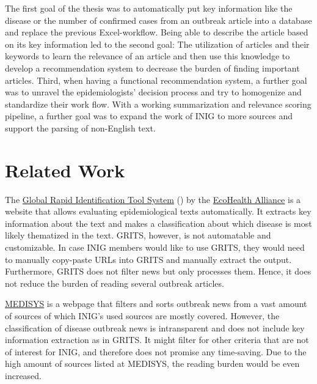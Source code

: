   The first goal of the thesis was to automatically put key information like the disease or the number of confirmed cases from an outbreak article into a database and replace the previous Excel-workflow. Being able to describe the article based on its key information led to the second goal: The utilization of articles and their keywords to learn the relevance of an article and then use this knowledge to develop a recommendation system to decrease the burden of finding important articles.
  Third, when having a functional recommendation system, a further goal was to unravel the epidemiologists' decision process and try to homogenize and standardize their work flow.
  With a working summarization and relevance scoring pipeline, a further goal was to expand the work of INIG to more sources and support the parsing of non-English text.


\section{Related Work}
  The \href{https://grits.eha.io}{Global Rapid Identification Tool System} () by the \href{https://www.ecohealthalliance.org}{EcoHealth Alliance} is a website that allows evaluating epidemiological texts automatically.
  It extracts key information about the text and makes a classification about which disease is most likely thematized in the text.
  GRITS, however, is not automatable and customizable.
  In case INIG members would like to use GRITS, they would need to manually copy-paste URLs into GRITS and manually extract the output.
  Furthermore, GRITS does not filter news but only processes them.
  Hence, it does not reduce the burden of reading several outbreak articles.

  \href{http://medisys.newsbrief.eu}{MEDISYS} is a webpage that filters and sorts outbreak news from a vast amount of sources of which INIG's used sources are mostly covered.
  However, the classification of disease outbreak news is intransparent and does not include key information extraction as in GRITS.
  It might filter for other criteria that are not of interest for INIG, and therefore does not promise any time-saving.
  Due to the high amount of sources listed at MEDISYS, the reading burden would be even increased.
